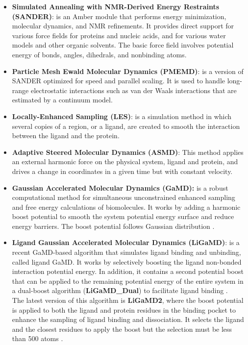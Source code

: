 \documentclass[
  journal=usp, %
  manuscript=final-report,
  year=2023,
  volume=1,
]{cup-journal}
\begin{document}
\begin{itemize}
    \item \textbf{Simulated Annealing with NMR-Derived Energy Restraints (SANDER)}: is an Amber module that performs energy minimization, molecular dynamics, and NMR refinements. It provides direct support for various force fields for proteins and nucleic acids, and for various water models and other organic solvents. The basic force field involves potential energy of bonds, angles, dihedrals, and nonbinding atoms. \\
    
    \item \textbf{Particle Mesh Ewald Molecular Dynamics (PMEMD)}: is a version of SANDER  optimized for speed and parallel scaling. It is used to handle long-range electrostatic interactions such as van der Waals interactions that are estimated by a continuum model. \\
    
    \item \textbf{Locally-Enhanced Sampling (LES)}: is a simulation method in which several copies of a region, or a ligand, are created to smooth the interaction between the ligand and the protein.\\
    
    \item \textbf{Adaptive Steered Molecular Dynamics (ASMD)}: This method applies an external harmonic force on the physical system, ligand and protein, and drives a change in coordinates in a given time but with constant velocity. \\
    
    \item \textbf{Gaussian Accelerated Molecular Dynamics (GaMD):} is a robust computational method for simultaneous unconstrained enhanced sampling and free energy calculations of biomolecules. It works by adding a harmonic boost potential to smooth the system potential energy surface and reduce energy barriers. The boost potential follows Gaussian distribution \cite{gaussian_acelerated_basics}.\\
    
    \item \textbf{\textbf{Ligand Gaussian Accelerated Molecular Dynamics (LiGaMD)}}: is a recent GaMD-based algorithm that simulates ligand binding and unbinding, called ligand GaMD. It works by selectively boosting the ligand non-bonded interaction potential energy. In addition, it contains a second potential boost that can be applied to the remaining potential energy of the entire system in a dual-boost algorithm (\textbf{LiGaMD\_Dual}) to facilitate ligand binding \cite{ligamd_Miao}. \\

    The latest version of this algorithm is \textbf{LiGaMD2}, where the boost potential is applied to both the ligand and protein residues in the binding pocket to enhance the sampling of ligand binding and dissociation. It selects the ligand and the closest residues to apply the boost but the selection must be less than 500 atoms \cite{ligamd2}.
\end{itemize}
\end{document}
